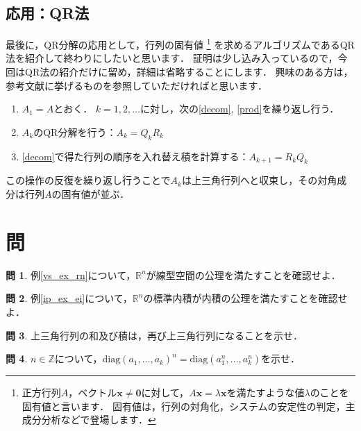\documentclass[dvipdfmx]{jsarticle}
\theoremstyle{definition}
\newtheorem{question}{問}[section]
\newcommand{\diag}[1]{\mathrm{diag}(#1)}
\begin{document}
\subsection{応用：QR法}  \label{subsec_qralg}
最後に，QR分解の応用として，行列の固有値
\footnote{
    正方行列$A$，ベクトル$\bm{x} \neq \bm{0}$に対して，$A\bm{x} = \lambda \bm{x}$を満たすような値$\lambda$のことを固有値と言います．
    固有値は，行列の対角化，システムの安定性の判定，主成分分析などで登場します．
}
を求めるアルゴリズムであるQR法を紹介して終わりにしたいと思います．
証明は少し込み入っているので，今回はQR法の紹介だけに留め，詳細は省略することにします．
興味のある方は，参考文献に挙げるものを参照していただければと思います．
\begin{enumerate}
    \item $A_1 = A$とおく．
        $k = 1, 2, \ldots$に対し，次の\ref{decom}, \ref{prod}を繰り返し行う．
    \item $A_k$のQR分解を行う：$A_k = Q_k R_k$  \label{decom}
    \item \ref{decom}で得た行列の順序を入れ替え積を計算する：$A_{k+1} = R_k Q_k$   \label{prod}
\end{enumerate}
この操作の反復を繰り返し行うことで$A_k$は上三角行列へと収束し，その対角成分は行列$A$の固有値が並ぶ．



\section{問}  \label{sec_question}
\begin{question}
    例\ref{vs_ex_rn}について，$\mathbb{R}^n$が線型空間の公理を満たすことを確認せよ．
\end{question}

\begin{question}
    例\ref{ip_ex_ei}について，$\mathbb{R}^n$の標準内積が内積の公理を満たすことを確認せよ．
\end{question}

\begin{question}
    \label{q_uptri}
    上三角行列の和及び積は，再び上三角行列になることを示せ．
\end{question}

\begin{question}
    \label{q_diagpow}
    $n \in \mathbb{Z}$について，$\diag{a_{1}, \ldots, a_{k}}^{n} = \diag{a_{1}^{n}, \ldots, a_{k}^{n}}$を示せ．
\end{question}
\end{document}
